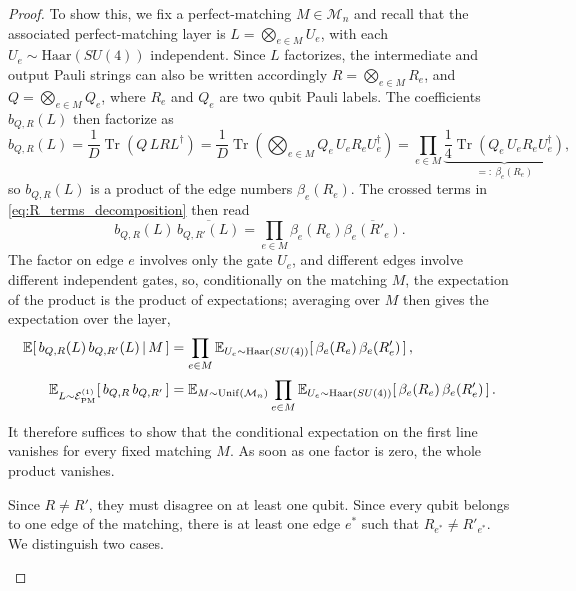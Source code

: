 \documentclass[
    aps,
    superscriptaddress,
    onecolumn,
    10pt,
    prx,
    nofootinbib
]{revtex4-2}
\theoremstyle{namedstatement}
\theoremstyle{plain}
\begin{document}
\begin{proof}
To show this, we fix a perfect-matching $M\in\mathcal{M}_n$ and recall that the associated perfect-matching layer is $L=\bigotimes_{e\in M}U_e$, with each $U_e \sim \mathrm{Haar}(SU(4))$ independent. Since $L$ factorizes, the intermediate and output Pauli strings can also be written accordingly $R=\bigotimes_{e\in M}R_e$, and $Q=\bigotimes_{e\in M}Q_e$, where $R_e$ and $Q_e$ are two qubit Pauli labels. The coefficients $b_{Q,R}(L)$ then factorize as
\begin{equation}
    b_{Q,R}(L)
    = \frac{1}{D}\operatorname{Tr}\!\left(Q\, L R L^{\dagger}\right)
    =\frac{1}{D}\operatorname{Tr}\!\left(\bigotimes_{e\in M}Q_e\, U_e R_e U_e^{\dagger}\right)
    = \prod_{e \in M}
      \underbrace{\frac{1}{4}\operatorname{Tr}\!\left(Q_e\, U_e R_e U_e^{\dagger}\right)}_{=:\ \beta_e(R_e)},
\end{equation}
so $b_{Q,R}(L)$ is a product of the edge numbers $\beta_e(R_e)$. The crossed terms in \cref{eq:R_terms_decomposition} then read
\begin{equation}
    b_{Q,R}(L)\, \overline{b_{Q,R'}(L)}=\prod_{e \in M} \beta_e(R_e) \overline{\beta_e(R'_e)}.
\end{equation}
The factor on edge $e$ involves only the gate $U_e$, and different edges involve different
independent gates, so, conditionally on the matching $M$, the expectation of the product is
the product of expectations; averaging over $M$ then gives the expectation over the layer,
\begin{align}
\mathbb{E}\!\left[\, b_{Q,R}(L)\, b_{Q,R'}(L) \,\middle|\, M \,\right]
&{}= \prod_{e \in M} \mathbb{E}_{U_e \sim \mathrm{Haar}(SU(4))}\!\left[\, \beta_e(R_e)\,
\beta_e(R'_e) \,\right], \nonumber \\[2pt]
\mathbb{E}_{L \sim \mathcal{E}^{(1)}_{\rm PM}}\!\left[\, b_{Q,R}\, b_{Q,R'} \,\right]
&= \mathbb{E}_{M \sim \mathrm{Unif}(\mathcal{M}_n)} \prod_{e \in M}
\mathbb{E}_{U_e \sim \mathrm{Haar}(SU(4))}\!\left[\, \beta_e(R_e)\, \beta_e(R'_e) \,\right].
\label{eq:layer_prod}
\end{align}
It therefore suffices to show that the conditional expectation on the first line vanishes for
every fixed matching $M$. As soon as one factor is zero, the whole product vanishes.

Since $R\neq R'$, they must disagree on at least one qubit. Since every qubit belongs to one edge of the matching, there is at least one edge $e^*$ such that $R_{e^*} \neq R'_{e^*}$. We distinguish two cases.
\begin{enumerate}
    

\end{enumerate}
\end{proof}
\end{document}
